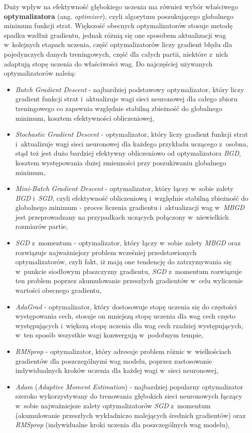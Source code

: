 Duży wpływ na efektywność głębokiego uczenia ma również wybór właściwego \textbf{optymalizatora} (ang. \emph{optimizer}), czyli algorytmu poszukującego globalnego minimum funkcji strat. Większość obecnych optymalizatorów stosuje metodę spadku wzdłuż gradientu, jednak różnią się one sposobem aktualizacji wag w~kolejnych etapach uczenia, część optymalizatorów liczy gradient błędu dla pojedynczych danych treningowych, część dla całych partii, niektóre z~nich adaptują stopę uczenia do właściwości wag. Do najczęściej używanych optymalizatorów należą:

\begin{itemize}
\item \emph{Batch Gradient Descent} - najbardziej podstawowy optymalizator, który liczy gradient funkcji strat i~aktualizuje wagi sieci neuronowej dla całego zbioru treningowego co zapewnia względnie stabilną zbieżność do globalnego minimum, kosztem efektywności obliczeniowej,
\item \emph{Stochastic Gradient Descent} - optymalizator, który liczy gradient funkcji strat i~aktualizuje wagi sieci neuronowej dla każdego przykładu uczącego z~osobna, stąd też jest dużo bardziej efektywny obliczeniowo od optymalizatora \emph{BGD}, kosztem występowania dużej zmienności przy poszukiwaniu globalnego minimum,
\item \emph{Mini-Batch Gradient Descent} - optymalizator, który łączy w~sobie zalety \emph{BGD} i~\emph{SGD}, czyli efektywność obliczeniową i~względnie stabilną zbieżność do globalnego minimum -  proces liczenia gradientu i~aktualizacji wag w~\emph{MBGD} jest przeprowadzany na przypadkach uczących połączony w~niewielkich rozmiarów partie,
\item \emph{SGD} z~momentum - optymalizator, który łączy w~sobie zalety \emph{MBGD} oraz rozwiązuje najważniejszy problem wcześniej przedstawionych optymalizatorów, czyli fakt, iż mają one tendencję do zatrzymywania się w~punkcie siodłowym płaszczyzny gradientu, \emph{SGD} z~momentum rozwiązuje ten problem poprzez akumulowanie przeszłych gradientów w~celu wyliczenie wartości obecnego gradientu,
\item \emph{AdaGrad} - optymalizator, który dostosowuje stopę uczenia się do częstości występowania cech, stosuje on mniejszą stopę uczenia dla wag cech często występujących i~większą stopę uczenia dla wag cech rzadziej występujących, w~ten sposób wszystkie wagi konwergują w~podobnym tempie,
\item \emph{RMSprop} - optymalizator, który adresuje problem różnic w~wielkościach gradientów dla poszczególnymi wag modelu, poprzez zastosowanie indywidualnych kroków uczenia dla każdej wagi w~sieci neuronowej, 
\item \emph{Adam} (\emph{Adaptive Moment Estimation}) - najbardziej popularny optymalizator szeroko wykorzystywany do trenowania głębokich sieci neuronowych łączący w~sobie najważniejsze zalety optymalizatorów \emph{SGD} z~momentum (akumulowanie przeszłych wykładniczo malejących średnich gradientów) oraz \emph{RMSprop} (indywidualne kroki uczenia dla poszczególnych wag modelu),
\end{itemize}

